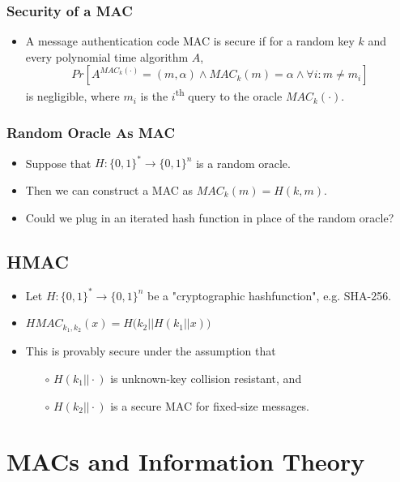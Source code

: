 \documentclass[a4paper]{scrartcl}
\newcommand{\ts}{\textsuperscript}
\begin{document}
\subsubsection*{Security of a MAC}
\begin{itemize}
\item A message authentication code MAC is secure if for a random key $k$ and every polynomial time algorithm $A$,
$$Pr[A^{MAC_k(\cdot)}=(m,\alpha) \land MAC_k(m) = \alpha \land \forall i : m \neq m_i]$$
is negligible, where $m_i$ is the $i$\ts{th} query to the oracle $MAC_k(\cdot)$.
\end{itemize}

\subsubsection*{Random Oracle As MAC}

\begin{itemize}
\item Suppose that $H: \{0,1\}^* \rightarrow \{0,1\}^n$ is a random oracle.
\item Then we can construct a MAC as $MAC_k(m) = H(k,m)$.
\item Could we plug in an iterated hash function in place of the random oracle?
\end{itemize}

\subsection*{HMAC}

\begin{itemize}
\item Let $H: \{0,1\}^* \rightarrow \{0,1\}^n$ be a "cryptographic hashfunction", e.g. SHA-256.
\item $HMAC_{k_1, k_2}(x) = H\big(k_2||H(k_1||x)\big)$
\item This is provably secure under the assumption that
\begin{itemize}
\item [$\circ$] $H(k_1||\cdot)$ is unknown-key collision resistant, and
\item [$\circ$] $H(k_2||\cdot)$ is a secure MAC for fixed-size messages.
\end{itemize}
\end{itemize}

\section*{MACs and Information Theory}
\end{document}
